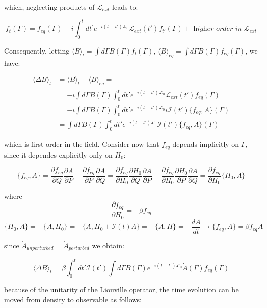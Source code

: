 \documentclass{article}
\begin{document}
which, neglecting products of $\mathcal{L}_{ext}$ leads to:

$$ f_t(\Gamma) = f_{eq}(\Gamma) - i \int_{0}^{t} dt^{'} e^{-i(t-t') \mathcal{L}_0} \mathcal{L}_{ext}(t') f_{t'}(\Gamma) + \textit{ higher order in } \mathcal{L}_{ext}$$


Consequently, letting $\langle B \rangle_t = \int d \Gamma B(\Gamma) f_t(\Gamma)$, $\langle B \rangle_{eq} =  \int d \Gamma B(\Gamma) f_{eq}(\Gamma) $, we have:

\begin{align*}
\langle \Delta B \rangle_t  &= \langle B \rangle_t - \langle B \rangle_{eq} =\\
& = -i \int d \Gamma B(\Gamma) \int_{0}^{t} dt' e^{-i(t-t') \mathcal{L}_0} \mathcal{L}_{ext}(t') f_{eq}(\Gamma) \\
& =  -i \int d \Gamma B(\Gamma) \int_{0}^{t} dt' e^{-i(t-t') \mathcal{L}_0} i \mathcal{I}(t') \{ f_{eq}, A \}(\Gamma) \\
& = \int d \Gamma B(\Gamma)  \int_{0}^{t} dt' e^{-i(t-t') \mathcal{L}_0} \mathcal{I}(t') \{ f_{eq}, A \}(\Gamma)
\end{align*}

which is first order in the field. Consider now that $f_{eq}$ depends implicitly on $\Gamma$, since it dependes explicitly only on $H_0$:

$$\{ f_{eq}, A \} = \frac{\partial f_{eq}}{\partial Q}  \frac{\partial A}{\partial P} -  \frac{\partial f_{eq}}{\partial P} \frac{\partial A}{\partial Q} =  \frac{\partial f_{eq} }{\partial H_0} \frac{\partial H_0 }{\partial Q} \frac{\partial A}{\partial P} -  \frac{\partial f_{eq}}{\partial H_0}  \frac{\partial H_0}{\partial P}  \frac{\partial A}{\partial Q} =  \frac{\partial f_{eq} }{\partial H_0} \{ H_0, A \}$$

where 
$$\frac{\partial f_{eq} }{\partial H_0} = - \beta f_{eq}$$
$$ \{ H_0, A \} = -  \{ A, H_0 \} =  -  \{ A, H_0 + \mathcal{I}(t) A \} = - \{ A, H \} = -\frac{dA}{dt} \rightarrow \{ f_{eq}, A \} = \beta f_{eq} \dot{A}$$

since $\dot{A}_{unperturbed} = \dot{A}_{perturbed}$ we obtain:

\begin{equation}
	\langle \Delta B \rangle_t = \beta \int_{0}^{t} dt' \mathcal{I}(t') \int d \Gamma B(\Gamma) e^{-i(t-t')\mathcal{L}_0 } \dot{A}(\Gamma) f_{eq}(\Gamma)
\end{equation}

because of the unitarity of the  Liouville operator, the time evolution can be moved from density to observable as follows:
\end{document}
